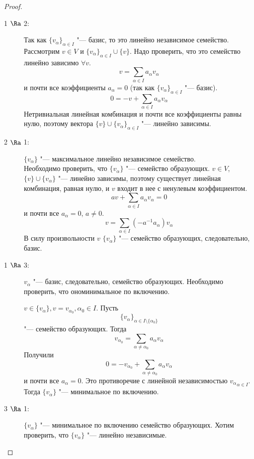 \begin{proof}
	\begin{description}
	\item [1 $\Ra$ 2:]
		Так как $\{v_{\alpha}\}_{\alpha \in I}$ "--- базис, то это линейно независимое семейство.
		Рассмотрим $v \in V$ и $\{v_{\alpha}\}_{\alpha \in I} \cup \{v\}$.
		Надо проверить, что это семейство линейно зависимо $\forall v$.
		\[ v = \sum_{\alpha \in I} a_{\alpha}v_{\alpha} \]
		и почти все коэффициенты $a_{\alpha} = 0$ (так как $\{v_{\alpha}\}_{\alpha \in I}$ "--- базис).
		\[ 0 = -v + \sum_{\alpha \in I} a_{\alpha}v_{\alpha} \]
		Нетривиальная линейная комбинация и почти все коэффициенты равны нулю, поэтому вектора $\{v\} \cup \{v_{\alpha}\}_{\alpha \in I}$ "--- линейно зависимы.

	\item [2 $\Ra$ 1:]
		$\{v_{\alpha}\}$ "--- максимальное линейно независимое семейство. \\
		Необходимо проверить, что $\{v_{\alpha}\}$ "--- семейство образующих.
		$v \in V$, $\{v\} \cup \{v_{\alpha}\}$ "--- линейно зависимы, поэтому существует линейная комбинация, равная нулю,
		и $v$ входит в нее с ненулевым коэффициентом.
		\[ av + \sum_{\alpha \in I}a_{\alpha}v_{\alpha} = 0 \]
		и почти все $a_{\alpha} = 0$, $a \ne 0$.
		\[ v = \sum_{\alpha \in I}(-a^{-1}a_{\alpha})v_{\alpha} \]
		В силу произвольности $v$ $\{v_{\alpha}\}$ "--- семейство образующих, следовательно, базис.

	\item [1 $\Ra$ 3:]
		${v_{\alpha}}$ "--- базис, следовательно, семейство образующих.
		Необходимо проверить, что ономинимальное по включению.

		$v \in \{v_{\alpha}\}, v = v_{\alpha_0}, \alpha_0 \in I$.
		Пусть
		\[ \{v_{\alpha}\}_{\alpha \in I \setminus \{\alpha_0\}} \]
		"--- семейство образующих. Тогда
		\[ v_{\alpha_0} = \sum_{\alpha \ne \alpha_0} a_{\alpha}v_{\alpha} \]
		Получили
		\[ 0 = -v_{\alpha_0} + \sum_{\alpha \ne \alpha_0}a_{\alpha} v_{\alpha} \]
		и почти все $a_{\alpha} = 0$.
		Это противоречие с линейной независимостью ${v_\alpha}_{{\alpha} \in I}$.
		Тогда $\{v_{\alpha}\}$ "--- минимальное по включению.

	\item [3 $\Ra$ 1:]
		$\{v_{\alpha}\}$ "--- минимальное по включению семейство образующих.
		Хотим проверить, что $\{v_{\alpha}\}$ "--- линейно независимые.


\end{description}
\end{proof}
